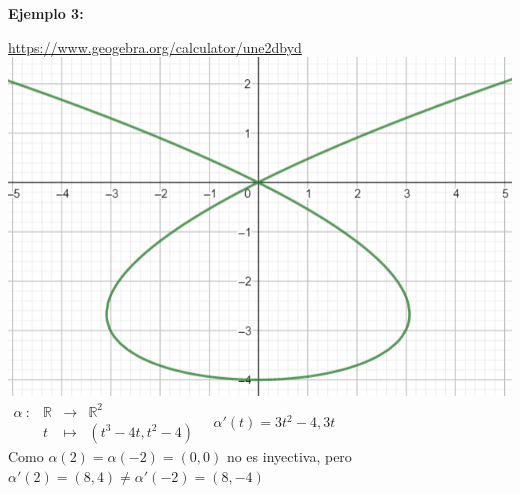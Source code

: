 \documentclass{article}
\begin{document}
\textbf{Ejemplo 3:}
\begin{center}
    \url{https://www.geogebra.org/calculator/une2dbyd}\\
    \includegraphics[scale=0.4]{figuras/ejemplos 1/ejemplo 3.PNG}\\
    $\begin{array}{cccl}
    \alpha\::&\mathbb{R}&\longrightarrow&\mathbb{R}^2\\
        &t&\longmapsto&(t^3-4t,t^2-4)
\end{array} \quad \alpha'(t)=3t^2-4,3t$\\
Como $\alpha(2)=\alpha(-2)=(0,0)$ no es inyectiva, pero $\alpha'(2)=(8,4)\ne\alpha'(-2)=(8,-4)$
\end{center}\newpage
\end{document}
